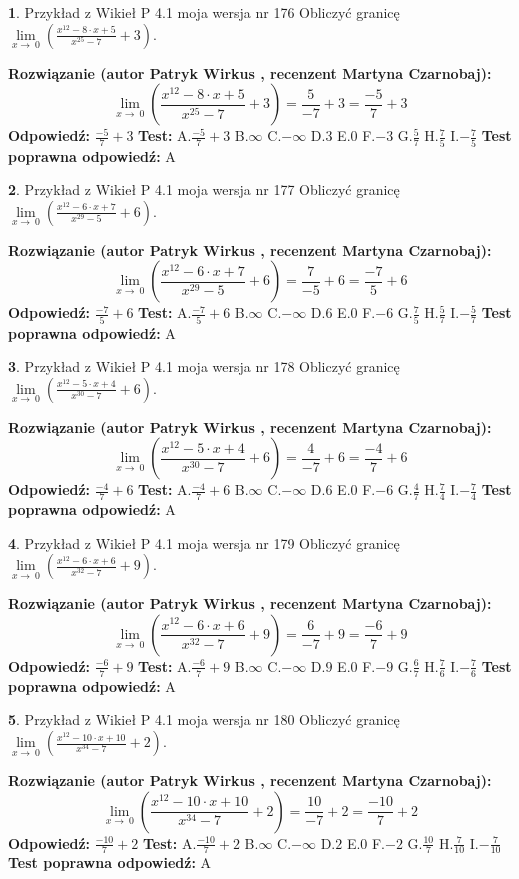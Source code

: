 \documentclass[12pt, a4paper]{article}
\theoremstyle{definition} %
\newtheorem{zad}{}
\newcommand{\zadStart}[1]{\begin{zad}#1\newline}
\newcommand{\zadStop}{\end{zad}}
\newcommand{\rozwStart}[2]{\noindent \textbf{Rozwiązanie (autor #1 , recenzent #2): }\newline}
\newcommand{\rozwStop}{\newline}
\newcommand{\odpStart}{\noindent \textbf{Odpowiedź:}\newline}
\newcommand{\odpStop}{\newline}
\newcommand{\testStart}{\noindent \textbf{Test:}\newline}
\newcommand{\testStop}{\newline}
\newcommand{\kluczStart}{\noindent \textbf{Test poprawna odpowiedź:}\newline}
\newcommand{\kluczStop}{\newline}
\begin{document}
\zadStart{Przykład z Wikieł P 4.1 moja wersja nr 176}
Obliczyć granicę $\lim\limits_{x\to\ 0}(\frac{x^{12}-8 \cdot x +5}{x^{25}-7}+3)$.
\zadStop
\rozwStart{Patryk Wirkus}{Martyna Czarnobaj}
$$\lim\limits_{x\to\ 0}(\frac{x^{12}-8 \cdot x +5}{x^{25}-7}+3)=\frac{5}{-7}+3=\frac{-5}{7}+3$$
\rozwStop
\odpStart
$\frac{-5}{7}+3$
\odpStop
\testStart
A.$\frac{-5}{7}+3$
B.$\infty$
C.$-\infty$
D.$3$
E.$0$
F.$-3$
G.$\frac{5}{7}$
H.$\frac{7}{5}$
I.$-\frac{7}{5}$
\testStop
\kluczStart
A
\kluczStop



\zadStart{Przykład z Wikieł P 4.1 moja wersja nr 177}
Obliczyć granicę $\lim\limits_{x\to\ 0}(\frac{x^{12}-6 \cdot x +7}{x^{29}-5}+6)$.
\zadStop
\rozwStart{Patryk Wirkus}{Martyna Czarnobaj}
$$\lim\limits_{x\to\ 0}(\frac{x^{12}-6 \cdot x +7}{x^{29}-5}+6)=\frac{7}{-5}+6=\frac{-7}{5}+6$$
\rozwStop
\odpStart
$\frac{-7}{5}+6$
\odpStop
\testStart
A.$\frac{-7}{5}+6$
B.$\infty$
C.$-\infty$
D.$6$
E.$0$
F.$-6$
G.$\frac{7}{5}$
H.$\frac{5}{7}$
I.$-\frac{5}{7}$
\testStop
\kluczStart
A
\kluczStop



\zadStart{Przykład z Wikieł P 4.1 moja wersja nr 178}
Obliczyć granicę $\lim\limits_{x\to\ 0}(\frac{x^{12}-5 \cdot x +4}{x^{30}-7}+6)$.
\zadStop
\rozwStart{Patryk Wirkus}{Martyna Czarnobaj}
$$\lim\limits_{x\to\ 0}(\frac{x^{12}-5 \cdot x +4}{x^{30}-7}+6)=\frac{4}{-7}+6=\frac{-4}{7}+6$$
\rozwStop
\odpStart
$\frac{-4}{7}+6$
\odpStop
\testStart
A.$\frac{-4}{7}+6$
B.$\infty$
C.$-\infty$
D.$6$
E.$0$
F.$-6$
G.$\frac{4}{7}$
H.$\frac{7}{4}$
I.$-\frac{7}{4}$
\testStop
\kluczStart
A
\kluczStop



\zadStart{Przykład z Wikieł P 4.1 moja wersja nr 179}
Obliczyć granicę $\lim\limits_{x\to\ 0}(\frac{x^{12}-6 \cdot x +6}{x^{32}-7}+9)$.
\zadStop
\rozwStart{Patryk Wirkus}{Martyna Czarnobaj}
$$\lim\limits_{x\to\ 0}(\frac{x^{12}-6 \cdot x +6}{x^{32}-7}+9)=\frac{6}{-7}+9=\frac{-6}{7}+9$$
\rozwStop
\odpStart
$\frac{-6}{7}+9$
\odpStop
\testStart
A.$\frac{-6}{7}+9$
B.$\infty$
C.$-\infty$
D.$9$
E.$0$
F.$-9$
G.$\frac{6}{7}$
H.$\frac{7}{6}$
I.$-\frac{7}{6}$
\testStop
\kluczStart
A
\kluczStop



\zadStart{Przykład z Wikieł P 4.1 moja wersja nr 180}
Obliczyć granicę $\lim\limits_{x\to\ 0}(\frac{x^{12}-10 \cdot x +10}{x^{34}-7}+2)$.
\zadStop
\rozwStart{Patryk Wirkus}{Martyna Czarnobaj}
$$\lim\limits_{x\to\ 0}(\frac{x^{12}-10 \cdot x +10}{x^{34}-7}+2)=\frac{10}{-7}+2=\frac{-10}{7}+2$$
\rozwStop
\odpStart
$\frac{-10}{7}+2$
\odpStop
\testStart
A.$\frac{-10}{7}+2$
B.$\infty$
C.$-\infty$
D.$2$
E.$0$
F.$-2$
G.$\frac{10}{7}$
H.$\frac{7}{10}$
I.$-\frac{7}{10}$
\testStop
\kluczStart
A
\kluczStop
\end{document}
